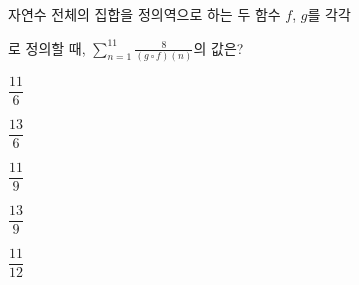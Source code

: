 \hspace*{2mm}\begin{minipage}[t]{\dimexpr\linewidth-2mm\relax}\vspace{0pt}
자연수 전체의 집합을 정의역으로 하는 두 함수 $f$, $g$를 각각 \par\smallskip{}\par\smallskip\noindent 로 정의할 때, $\displaystyle\sum_{n=1}^{11}\frac{8}{(g\circ f)(n)}$의 값은?
\begin{choices32}{\rule[-3ex]{0pt}{8ex}$\dfrac{11}{6}$}{\rule[-3ex]{0pt}{8ex}$\dfrac{13}{6}$}{\rule[-3ex]{0pt}{8ex}$\dfrac{11}{9}$}{\rule[-3ex]{0pt}{8ex}$\dfrac{13}{9}$}{\rule[-3ex]{0pt}{8ex}$\dfrac{11}{12}$}\end{choices32}\end{minipage}
